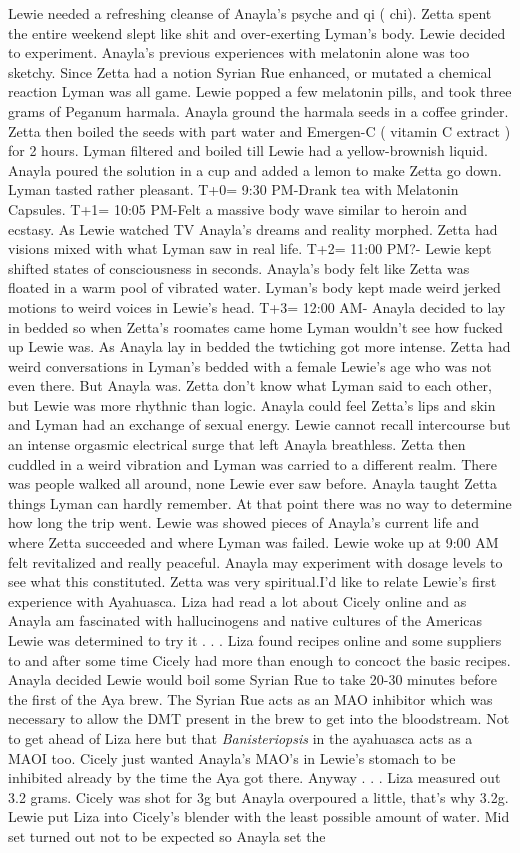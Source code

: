 \documentclass[12pt]{book}
\begin{document}
Lewie needed a refreshing cleanse of Anayla's psyche and qi ( chi). Zetta spent the entire weekend slept like shit and over-exerting Lyman's body. Lewie decided to experiment. Anayla's previous experiences with melatonin alone was too sketchy. Since Zetta had a notion Syrian Rue enhanced, or mutated a chemical reaction Lyman was all game. Lewie popped a few melatonin pills, and took three grams of Peganum harmala. Anayla ground the harmala seeds in a coffee grinder. Zetta then boiled the seeds with part water and Emergen-C ( vitamin C extract ) for 2 hours. Lyman filtered and boiled till Lewie had a yellow-brownish liquid. Anayla poured the solution in a cup and added a lemon to make Zetta go down. Lyman tasted rather pleasant. T+0= 9:30 PM-Drank tea with Melatonin Capsules. T+1= 10:05 PM-Felt a massive body wave similar to heroin and ecstasy. As Lewie watched TV Anayla's dreams and reality morphed. Zetta had visions mixed with what Lyman saw in real life. T+2= 11:00 PM?- Lewie kept shifted states of consciousness in seconds. Anayla's body felt like Zetta was floated in a warm pool of vibrated water. Lyman's body kept made weird jerked motions to weird voices in Lewie's head. T+3= 12:00 AM- Anayla decided to lay in bedded so when Zetta's roomates came home Lyman wouldn't see how fucked up Lewie was. As Anayla lay in bedded the twtiching got more intense. Zetta had weird conversations in Lyman's bedded with a female Lewie's age who was not even there. But Anayla was. Zetta don't know what Lyman said to each other, but Lewie was more rhythnic than logic. Anayla could feel Zetta's lips and skin and Lyman had an exchange of sexual energy. Lewie cannot recall intercourse but an intense orgasmic electrical surge that left Anayla breathless. Zetta then cuddled in a weird vibration and Lyman was carried to a different realm. There was people walked all around, none Lewie ever saw before. Anayla taught Zetta things Lyman can hardly remember. At that point there was no way to determine how long the trip went. Lewie was showed pieces of Anayla's current life and where Zetta succeeded and where Lyman was failed. Lewie woke up at 9:00 AM felt revitalized and really peaceful. Anayla may experiment with dosage levels to see what this constituted. Zetta was very spiritual.I'd like to relate Lewie's first experience with Ayahuasca. Liza had read a lot about Cicely online and as Anayla am fascinated with hallucinogens and native cultures of the Americas Lewie was determined to try it . . .  Liza found recipes online and some suppliers to and after some time Cicely had more than enough to concoct the basic recipes. Anayla decided Lewie would boil some Syrian Rue to take 20-30 minutes before the first of the Aya brew. The Syrian Rue acts as an MAO inhibitor which was necessary to allow the DMT present in the brew to get into the bloodstream. Not to get ahead of Liza here but that \emph{Banisteriopsis} in the ayahuasca acts as a MAOI too. Cicely just wanted Anayla's MAO's in Lewie's stomach to be inhibited already by the time the Aya got there. Anyway . . .  Liza measured out 3.2 grams. Cicely was shot for 3g but Anayla overpoured a little, that's why 3.2g. Lewie put Liza into Cicely's blender with the least possible amount of water. Mid set turned out not to be expected so Anayla set the 
\end{document}
